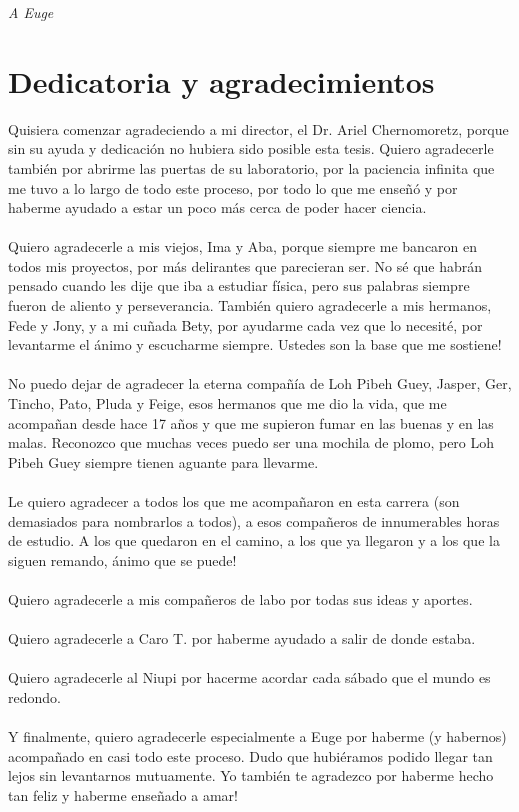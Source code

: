 \hfill \textit{A Euge}
\chapter*{Dedicatoria y agradecimientos}
Quisiera comenzar agradeciendo a mi director, el Dr. Ariel Chernomoretz, porque sin su ayuda y dedicación no hubiera sido posible esta tesis. Quiero agradecerle también por abrirme las puertas de su laboratorio, por la paciencia infinita que me tuvo a lo largo de todo este proceso, por todo lo que me enseñó y por haberme ayudado a estar un poco más cerca de poder hacer ciencia.\\\\
Quiero agradecerle a mis viejos, Ima y Aba, porque siempre me bancaron en todos mis proyectos, por más delirantes que parecieran ser. No sé que habrán pensado cuando les dije que iba a estudiar física, pero sus palabras siempre fueron de aliento y perseverancia. También quiero agradecerle a mis hermanos, Fede y Jony, y a mi cuñada Bety, por ayudarme cada vez que lo necesité, por levantarme el ánimo y escucharme siempre. Ustedes son la base que me sostiene!\\\\
No puedo dejar de agradecer la eterna compañía de Loh Pibeh Guey, Jasper, Ger, Tincho, Pato, Pluda y Feige, esos hermanos que me dio la vida, que me acompañan desde hace 17 años y que me supieron fumar en las buenas y en las malas. Reconozco que muchas veces puedo ser una mochila de plomo, pero Loh Pibeh Guey siempre tienen aguante para llevarme.\\\\
Le quiero agradecer a todos los que me acompañaron en esta carrera (son demasiados para nombrarlos a todos), a esos compañeros de innumerables horas de estudio. A los que quedaron en el camino, a los que ya llegaron y a los que la siguen remando, ánimo que se puede!\\\\
Quiero agradecerle a mis compañeros de labo por todas sus ideas y aportes.\\\\
Quiero agradecerle a Caro T. por haberme ayudado a salir de donde estaba.\\\\
Quiero agradecerle al Niupi por hacerme acordar cada sábado que el mundo es redondo.\\\\
Y finalmente, quiero agradecerle especialmente a Euge por haberme (y habernos) acompañado en casi todo este proceso. Dudo que hubiéramos podido llegar tan lejos sin levantarnos mutuamente. Yo también te agradezco por haberme hecho tan feliz y haberme enseñado a amar!